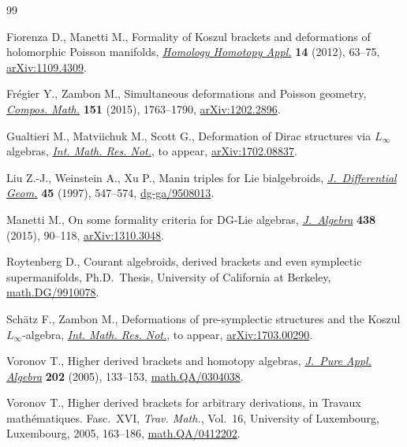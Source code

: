 \documentclass[10pt,a4paper]{amsart}
\numberwithin{equation}{section}
\begin{document}

\begin{thebibliography}{99}
\footnotesize\itemsep=0pt

Fiorenza D., Manetti M., Formality of {K}oszul brackets and deformations of
 holomorphic {P}oisson manifolds, \href{https://doi.org/10.4310/HHA.2012.v14.n2.a4}{\textit{Homology Homotopy Appl.}} \textbf{14}
 (2012), 63--75, \href{https://arxiv.org/abs/1109.4309}{arXiv:1109.4309}.

Fr\'{e}gier Y., Zambon M., Simultaneous deformations and {P}oisson geometry,
 \href{https://doi.org/10.1112/S0010437X15007277}{\textit{Compos. Math.}} \textbf{151} (2015), 1763--1790, \href{https://arxiv.org/abs/1202.2896}{arXiv:1202.2896}.

Gualtieri M., Matviichuk M., Scott G., Deformation of {D}irac structures via
 {$L_{\infty}$} algebras, \href{https://doi.org/10.1093/imrn/rny134}{\textit{Int. Math. Res. Not.}}, {t}o appear,
 \href{https://arxiv.org/abs/1702.08837}{arXiv:1702.08837}.

Liu Z.-J., Weinstein A., Xu P., Manin triples for {L}ie bialgebroids,
 \href{https://doi.org/10.4310/jdg/1214459842}{\textit{J.~Differential Geom.}} \textbf{45} (1997), 547--574,
 \href{https://arxiv.org/abs/dg-ga/9508013}{dg-ga/9508013}.

Manetti M., On some formality criteria for {DG}-{L}ie algebras,
 \href{https://doi.org/10.1016/j.jalgebra.2015.04.029}{\textit{J.~Algebra}} \textbf{438} (2015), 90--118, \href{https://arxiv.org/abs/1310.3048}{arXiv:1310.3048}.

Roytenberg D., Courant algebroids, derived brackets and even symplectic
 supermanifolds, Ph.D.~Thesis, University of California at Berkeley,
 \href{https://arxiv.org/abs/math.DG/9910078}{math.DG/9910078}.

Sch\"atz F., Zambon M., Deformations of pre-symplectic structures and the
 {K}oszul {$L_{\infty}$}-algebra, \href{https://doi.org/10.1093/imrn/rny123}{\textit{Int. Math. Res. Not.}}, {t}o appear,
 \href{https://arxiv.org/abs/1703.00290}{arXiv:1703.00290}.

Voronov T., Higher derived brackets and homotopy algebras, \href{https://doi.org/10.1016/j.jpaa.2005.01.010}{\textit{J.~Pure
 Appl. Algebra}} \textbf{202} (2005), 133--153, \href{https://arxiv.org/abs/math.QA/0304038}{math.QA/0304038}.

Voronov T., Higher derived brackets for arbitrary derivations, in Travaux
 math\'{e}matiques. {F}asc.~{XVI}, \textit{Trav. Math.}, Vol.~16, University
 of Luxembourg, Luxembourg, 2005, 163--186, \href{https://arxiv.org/abs/math.QA/0412202}{math.QA/0412202}.

\end{thebibliography}
\end{document}
